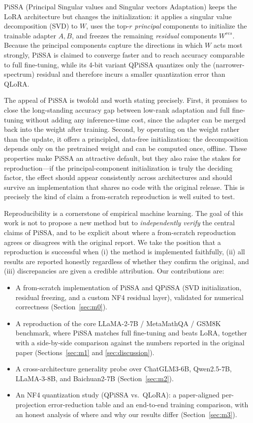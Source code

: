 \documentclass[mlmain]{jmlr}
\begin{document}
PiSSA (Principal Singular values and Singular vectors Adaptation) \citep{meng2024pissa} keeps the LoRA architecture but changes the initialization: it applies a singular value decomposition (SVD) to $W$, uses the top-$r$ \emph{principal} components to initialize the trainable adapter $A,B$, and freezes the remaining \emph{residual} components $W^{res}$. Because the principal components capture the directions in which $W$ acts most strongly, PiSSA is claimed to converge faster and to reach accuracy comparable to full fine-tuning, while its 4-bit variant QPiSSA quantizes only the (narrower-spectrum) residual and therefore incurs a smaller quantization error than QLoRA.

The appeal of PiSSA is twofold and worth stating precisely. First, it promises to close the long-standing accuracy gap between low-rank adaptation and full fine-tuning without adding any inference-time cost, since the adapter can be merged back into the weight after training. Second, by operating on the weight rather than the update, it offers a principled, data-free initialization: the decomposition depends only on the pretrained weight and can be computed once, offline. These properties make PiSSA an attractive default, but they also raise the stakes for reproduction---if the principal-component initialization is truly the deciding factor, the effect should appear consistently across architectures and should survive an implementation that shares no code with the original release. This is precisely the kind of claim a from-scratch reproduction is well suited to test.

Reproducibility is a cornerstone of empirical machine learning. The goal of this work is not to propose a new method but to \emph{independently verify} the central claims of PiSSA, and to be explicit about where a from-scratch reproduction agrees or disagrees with the original report. We take the position that a reproduction is successful when (i) the method is implemented faithfully, (ii) all results are reported honestly regardless of whether they confirm the original, and (iii) discrepancies are given a credible attribution. Our contributions are:
\begin{itemize}\setlength{\itemsep}{1pt}
\item A from-scratch implementation of PiSSA and QPiSSA (SVD initialization, residual freezing, and a custom NF4 residual layer), validated for numerical correctness (Section~\ref{sec:m0}).
\item A reproduction of the core LLaMA-2-7B / MetaMathQA / GSM8K benchmark, where PiSSA matches full fine-tuning and beats LoRA, together with a side-by-side comparison against the numbers reported in the original paper (Sections~\ref{sec:m1} and \ref{sec:discussion}).
\item A cross-architecture generality probe over ChatGLM3-6B, Qwen2.5-7B, LLaMA-3-8B, and Baichuan2-7B (Section~\ref{sec:m2}).
\item An NF4 quantization study (QPiSSA vs.\ QLoRA): a paper-aligned per-projection error-reduction table and an end-to-end training comparison, with an honest analysis of where and why our results differ (Section~\ref{sec:m3}).
\end{itemize}
\end{document}
